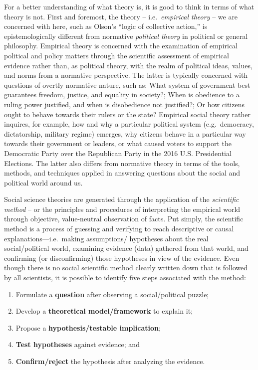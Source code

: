 \documentclass{book}
\begin{document}
For a better understanding of what theory is, it is good to think in terms of
what theory is not. First and foremost, the theory -- i.e.~\emph{empirical
theory} -- we are concerned with here, such as Olson's ``logic of collective
action,'' is epistemologically different from normative \emph{political
theory} in political or general philosophy. Empirical theory is concerned with
the examination of empirical political and policy matters through the
scientific assessment of empirical evidence rather than, as political theory,
with the realm of political ideas, values, and norms from a normative
perspective. The latter is typically concerned with questions of overtly
normative nature, such as: What system of government best guarantees freedom,
justice, and equality in society?; When is obedience to a ruling power
justified, and when is disobedience not justified?; Or how citizens ought to
behave towards their rulers or the state? Empirical social theory rather
inquires, for example, how and why a particular political system
(e.g.~democracy, dictatorship, military regime) emerges, why citizens behave
in a particular way towards their government or leaders, or what caused voters
to support the Democratic Party over the Republican Party in the 2016 U.S.
Presidential Elections. The latter also differs from normative theory in terms
of the tools, methods, and techniques applied in answering questions about the
social and political world around us.

Social science theories are generated through the application of the
\emph{scientific method} -- or the principles and procedures of interpreting
the empirical world through objective, value-neutral observation of facts. Put
simply, the scientific method is a process of guessing and verifying to reach
descriptive or causal explanations---i.e.~making assumptions/ hypotheses about
the real social/political world, examining evidence (data) gathered from that
world, and confirming (or disconfirming) those hypotheses in view of the
evidence. Even though there is no social scientific method clearly written
down that is followed by all scientists, it is possible to identify five steps
associated with the method:

\begin{enumerate}
\def\labelenumi{\arabic{enumi}.}
\item
  Formulate a \textbf{question} after observing a social/political puzzle;
\item
  Develop a \textbf{theoretical model/framework} to explain it;
\item
  Propose a \textbf{hypothesis/testable implication};
\item
  \textbf{Test hypotheses} against evidence; and
\item
  \textbf{Confirm/reject} the hypothesis after analyzing the evidence.
\end{enumerate}
\end{document}
